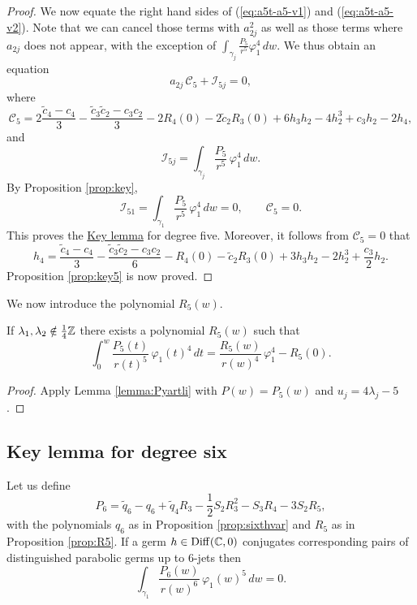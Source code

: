 \begin{proof}
We now equate the right hand sides of (\ref{eq:a5t-a5-v1}) and (\ref{eq:a5t-a5-v2}). Note that we can cancel those terms with $a_{2j}^2$ as well as those terms where $a_{2j}$ does not appear, with the exception of $\int_{\gamma_j}\frac{P_5}{r^5}\varphi_1^4\,dw$. We thus obtain an equation
\[ a_{2j}\,\mathcal{C}_5+\mathcal{I}_{5j}=0, \]
where 
\[ \mathcal{C}_5=2\frac{\tilde{c}_4-c_4}{3}-\frac{\tilde{c}_3\tilde{c}_2-c_3c_2}{3}-2R_4(0)-2\tilde{c}_2R_3(0)+6h_3h_2-4h_2^3+c_3h_2-2h_4, \]
and
\[ \mathcal{I}_{5j}=\int_{\gamma_j}\frac{P_5}{r^5}\,\varphi_1^{4}\,dw. \]
By Proposition \ref{prop:key},
\[ \mathcal{I}_{51}=\int_{\gamma_1}\frac{P_5}{r^5}\,\varphi_1^4\,dw=0, \qquad \mathcal{C}_5=0. \]
This proves the \hyperref[lemma:key]{Key lemma} for degree five. Moreover, it follows from $\mathcal{C}_5=0$ that
\[ h_4=\frac{\tilde{c}_4-c_4}{3}-\frac{\tilde{c}_3\tilde{c}_2-c_3c_2}{6}-R_4(0)-\tilde{c}_2R_3(0)+3h_3h_2-2h_2^3+\frac{c_3}{2}h_2. \]
Proposition \ref{prop:key5} is now proved.
\end{proof}

We now introduce the polynomial $R_5(w)$.

\begin{proposition}\label{prop:R5} 
If $\lambda_1,\lambda_2\notin\frac{1}{4}\mathbb{Z}$ there exists a polynomial $R_5(w)$ such that
\[ \int_0^w\frac{P_5(t)}{r(t)^5}\,\varphi_1(t)^4\,dt=\frac{R_5(w)}{r(w)^4}\,\varphi_1^4-R_5(0). \]
\end{proposition}

\begin{proof}
Apply Lemma \ref{lemma:Pyartli} with $P(w)=P_5(w)$ and $u_j=4\lambda_j-5$. 
\end{proof}





\subsection{Key lemma for degree six}


\begin{proposition}\label{prop:key6}
Let us define
\[ P_6=\tilde{q}_6-q_6+\tilde{q}_4R_3-\frac{1}{2}S_2R_3^2-S_3R_4-3S_2R_5, \]
with the polynomials $q_6$ as in Proposition \textnormal{\ref{prop:sixthvar}} and $R_5$ as in Proposition \textnormal{\ref{prop:R5}}. If a germ $h\in\operatorname{Diff}(\mathbb{C},0)$ conjugates corresponding pairs of distinguished parabolic germs up to $6$-jets then
\[ \int_{\gamma_1}\frac{P_6(w)}{r(w)^6}\,\varphi_1(w)^5\,dw=0. \]
\end{proposition}

